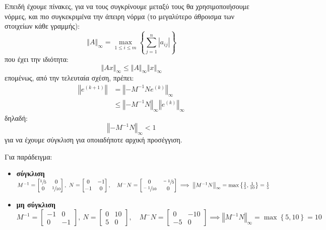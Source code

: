 \documentclass[11pt,a4paper,notitlepage,fleqn,final]{article}
\begin{document}
Επειδή έχουμε πίνακες, για να τους συγκρίνουμε μεταξύ τους θα
χρησιμοποιήσουμε νόρμες, και πιο συγκεκριμένα την άπειρη νόρμα
(το μεγαλύτερο άθροισμα των στοιχείων κάθε γραμμής):
\[
\left\Vert A \right\Vert_{\infty}
= \max_{1\leq i \leq m} \left\lbrace \sum_{j=1}^{n}
\left|a_{ij}\right| \right\rbrace
\]
που έχει την ιδιότητα:
\[
\left\Vert Ax \right\Vert_{\infty} \leq \Vert A \Vert_{\infty}
\Vert x \Vert_{\infty}
\]
επομένως, από την τελευταία σχέση, πρέπει:
\begin{align*}
	\left\Vert e^{(k+1)} \right\Vert &=
	\left\Vert -M^{-1}Ne^{(k)} \right\Vert_{\infty}
	\\ &\leq \left\Vert -M^{-1}N \right\Vert_{\infty}
	\left\Vert e^{(k)} \right\Vert_{\infty}
\end{align*}
δηλαδή:
\[
\left\Vert -M^{-1}N\right\Vert_{\infty} < 1
\]
για να έχουμε σύγκλιση για οποιαδήποτε αρχική προσέγγιση.

Για παράδειγμα:
\begin{itemize}
	\item \textbf{σύγκλιση} \(
	M^{-1} = \left[\begin{matrix}
	\sfrac{1}{5} & 0 \\
	0 & \sfrac{1}{10}
	\end{matrix}\right],\ N = \left[\begin{matrix}
	0&-1\\-1&0
	\end{matrix}\right],
	\quad M^{-}N = \left[\begin{matrix}
	0 & \sfrac{-1}{5} \\ \sfrac{-1}{10} & 0
	\end{matrix}\right] \implies
	\left\Vert M^{-1}N\right\Vert_{\infty} = \max \left\lbrace
	\frac{1}{5},\frac{1}{10} \right\rbrace = \frac{1}{5}
	 \)
	\item \textbf{μη σύγκλιση} \(
	M^{-1} = \left[\begin{matrix}
	-1 & 0 \\
	0 & -1
	\end{matrix}\right],\ N = \left[\begin{matrix}
	0&10\\5&0
	\end{matrix}\right],
	\quad M^{-}N = \left[\begin{matrix}
	0 & -10 \\ -5 & 0
	\end{matrix}\right] \implies
	\left\Vert M^{-1}N\right\Vert_{\infty} = \max \left\lbrace
	5,10 \right\rbrace = 10
	\)
\end{itemize}
\end{document}
